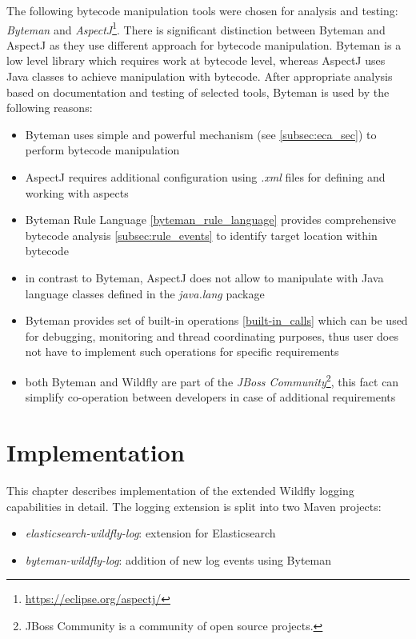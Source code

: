 \documentclass[12pt,oneside]{fithesis2}
\begin{document}
The following bytecode manipulation tools were chosen for analysis and testing: \textit{Byteman} and \textit{AspectJ}\footnote{\url{https://eclipse.org/aspectj/}}. There is significant distinction between Byteman and AspectJ as they use different approach for bytecode manipulation. Byteman is a low level library which requires work at bytecode level, whereas AspectJ uses Java classes to achieve manipulation with bytecode. After appropriate analysis based on documentation and testing of selected tools, Byteman is used by the following reasons:

\begin{itemize}
	\item Byteman uses simple and powerful mechanism (see \ref{subsec:eca_sec}) to perform bytecode manipulation 
	\item AspectJ requires additional configuration using \textit{.xml} files for defining and working with aspects \cite[Configuration]{aspectj_doc}
	\item Byteman Rule Language \ref{byteman_rule_language} provides comprehensive bytecode analysis \ref{subsec:rule_events} to identify target location within bytecode
	\item in contrast to Byteman, AspectJ does not allow to manipulate with Java language classes defined in the \textit{java.lang} package \cite[Special cases]{aspectj_doc}
	\item Byteman provides set of built-in operations \ref{built-in_calls} which can be used for debugging, monitoring and thread coordinating purposes, thus user does not have to implement such operations for specific requirements
	\item both Byteman and Wildfly are part of the \textit{JBoss Community}\footnote{JBoss Community is a community of open source projects.}, this fact can simplify co-operation between developers in case of additional requirements
\end{itemize}

\chapter{Implementation}
This chapter describes implementation of the extended Wildfly logging capabilities in detail. The logging extension is split into two Maven projects:

\begin{itemize}
	\item \textit{elasticsearch-wildfly-log}: extension for Elasticsearch
	\item \textit{byteman-wildfly-log}: addition of new log events using Byteman
\end{itemize}
\end{document}

